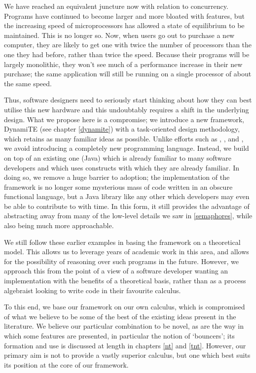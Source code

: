 We have reached an equivalent juncture now with relation to
concurrency.  Programs have continued to become larger and more
bloated with features, but the increasing speed of microprocessors has
allowed a state of equilibrium to be maintained.  This is no longer
so.  Now, when users go out to purchase a new computer, they are
likely to get one with twice the number of processors than the one
they had before, rather than twice the speed.  Because their programs
will be largely monolithic, they won't see much of a performance
increase in their new purchase; the same application will still be
running on a single processor of about the same speed.

Thus, software designers need to seriously start thinking about how
they can best utilise this new hardware and this undoubtably requires
a shift in the underlying design.  What we propose here is a
compromise; we introduce a new framework, DynamiTE (see chapter
\ref{dynamite}) with a task-oriented design methodology, which
retains as many familiar ideas as possible.  Unlike efforts such as
\cite{obliq}, \cite{daveturner:phd}, \cite{wojciechowski:phd} and
\cite{sangiorgi:safeambientsmachine}, we avoid introducing a
completely new programming language.  Instead, we build on top of an
existing one (Java) which is already familiar to many software
developers and which uses constructs with which they are already
familiar.  In doing so, we remove a huge barrier to adoption; the
implementation of the framework is no longer some mysterious mass of
code written in an obscure functional language, but a Java library
like any other which developers may even be able to contribute to with
time.  In this form, it still provides the advantage of abstracting
away from many of the low-level details we saw in \ref{semaphores},
while also being much more approachable.

We still follow these earlier examples in basing the framework on a
theoretical model.  This allows us to leverage years of academic work
in this area, and allows for the possibility of reasoning over such
programs in the future.  However, we approach this from the point of a
view of a software developer wanting an implementation with the
benefits of a theoretical basis, rather than as a process algebraist
looking to write code in their favourite calculus.

To this end, we base our framework on our own calculus, which is
compromised of what we believe to be some of the best of the existing
ideas present in the literature.  We believe our particular
combination to be novel, as are the way in which some features are
presented, in particular the notion of `bouncers'; its formation and
use is discussed at length in chapters \ref{nt} and \ref{tnt}.
However, our primary aim is not to provide a vastly superior calculus,
but one which best suits its position at the core of our framework.

